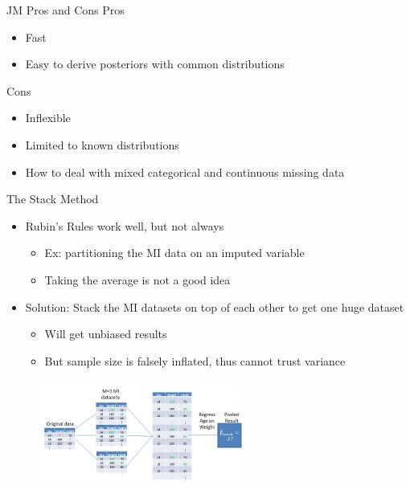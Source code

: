 \begin{frame}{JM Pros and Cons}
Pros
 \begin{itemize}
  \item Fast
  \item Easy to derive posteriors with common distributions
 \end{itemize}

 Cons
 \begin{itemize}
  \item Inflexible
  \item Limited to known distributions
  \item How to deal with mixed categorical and continuous missing data
 \end{itemize}

\end{frame}

\begin{frame}{The Stack Method}
 \begin{itemize}
  \item Rubin's Rules work well, but not always
  \begin{itemize}
   \item Ex: partitioning the MI data on an imputed variable
   \item Taking the average is not a good idea
  \end{itemize}
    \item Solution: Stack the MI datasets on top of each other to get one huge dataset
    \begin{itemize}
     \item Will get unbiased results
     \item But sample size is falsely inflated, thus cannot trust variance
    \end{itemize}
 \end{itemize}
 \begin{figure}[h!]
  \centering
    \includegraphics[width=0.6\textwidth]{stacked}
\label{fig:stacked}
\end{figure}
\end{frame}

